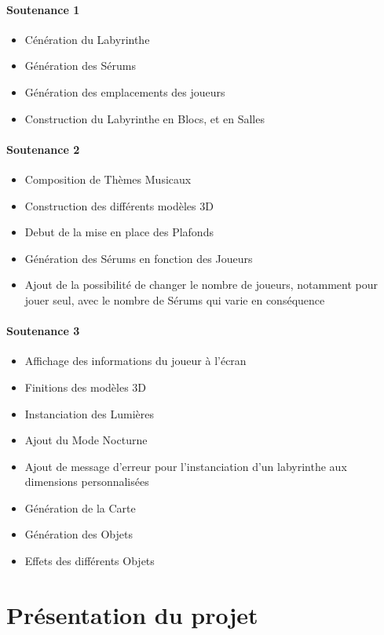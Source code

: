 \documentclass{article}
\begin{document}
\paragraph{Soutenance 1}
\begin{itemize}
    \item Cénération du Labyrinthe
    \item Génération des Sérums
    \item Génération des emplacements des joueurs
    \item Construction du Labyrinthe en Blocs, et en Salles
\end{itemize}

\paragraph{Soutenance 2}
\begin{itemize}
    \item Composition de Thèmes Musicaux
    \item Construction des différents modèles 3D
    \item Debut de la mise en place des Plafonds
    \item Génération des Sérums en fonction des Joueurs
    \item Ajout de la possibilité de changer le nombre de joueurs, notamment pour jouer seul, avec le nombre de Sérums qui varie en conséquence
\end{itemize}

\paragraph{Soutenance 3}
\begin{itemize}
    \item Affichage des informations du joueur à l'écran
    \item Finitions des modèles 3D
    \item Instanciation des Lumières
    \item Ajout du Mode Nocturne
    \item Ajout de message d'erreur pour l'instanciation d'un labyrinthe aux dimensions personnalisées
    \item Génération de la Carte
    \item Génération des Objets
    \item Effets des différents Objets
\end{itemize}
\newpage
\section{Présentation du projet}
\end{document}
